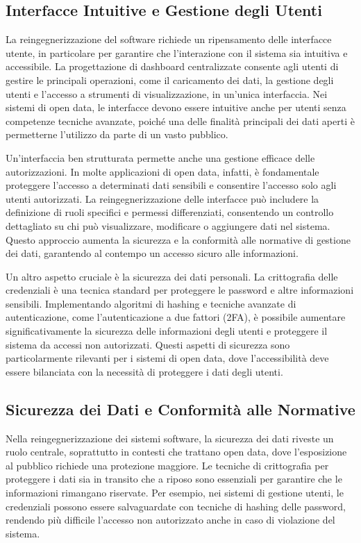 \subsection{Interfacce Intuitive e Gestione degli Utenti}

La reingegnerizzazione del software richiede un ripensamento delle interfacce utente, in particolare per garantire che l’interazione con il sistema sia intuitiva e accessibile. La progettazione di dashboard centralizzate consente agli utenti di gestire le principali operazioni, come il caricamento dei dati, la gestione degli utenti e l’accesso a strumenti di visualizzazione, in un’unica interfaccia. Nei sistemi di open data, le interfacce devono essere intuitive anche per utenti senza competenze tecniche avanzate, poiché una delle finalità principali dei dati aperti è permetterne l’utilizzo da parte di un vasto pubblico.

Un’interfaccia ben strutturata permette anche una gestione efficace delle autorizzazioni. In molte applicazioni di open data, infatti, è fondamentale proteggere l'accesso a determinati dati sensibili e consentire l'accesso solo agli utenti autorizzati. La reingegnerizzazione delle interfacce può includere la definizione di ruoli specifici e permessi differenziati, consentendo un controllo dettagliato su chi può visualizzare, modificare o aggiungere dati nel sistema. Questo approccio aumenta la sicurezza e la conformità alle normative di gestione dei dati, garantendo al contempo un accesso sicuro alle informazioni.

Un altro aspetto cruciale è la sicurezza dei dati personali. La crittografia delle credenziali è una tecnica standard per proteggere le password e altre informazioni sensibili. Implementando algoritmi di hashing e tecniche avanzate di autenticazione, come l'autenticazione a due fattori (2FA), è possibile aumentare significativamente la sicurezza delle informazioni degli utenti e proteggere il sistema da accessi non autorizzati. Questi aspetti di sicurezza sono particolarmente rilevanti per i sistemi di open data, dove l’accessibilità deve essere bilanciata con la necessità di proteggere i dati degli utenti.

\subsection{Sicurezza dei Dati e Conformità alle Normative}

Nella reingegnerizzazione dei sistemi software, la sicurezza dei dati riveste un ruolo centrale, soprattutto in contesti che trattano open data, dove l’esposizione al pubblico richiede una protezione maggiore. Le tecniche di crittografia per proteggere i dati sia in transito che a riposo sono essenziali per garantire che le informazioni rimangano riservate. Per esempio, nei sistemi di gestione utenti, le credenziali possono essere salvaguardate con tecniche di hashing delle password, rendendo più difficile l’accesso non autorizzato anche in caso di violazione del sistema.

